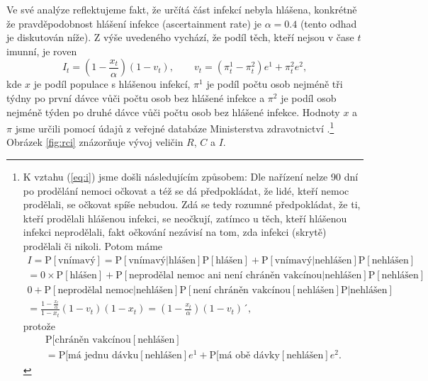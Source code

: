 Ve své analýze reflektujeme fakt, že určítá část infekcí nebyla
hlášena, konkrétně že pravděpodobnost hlášení infekce (ascertainment
rate) je $\alpha=0.4$ (tento odhad je diskutován níže). Z výše uvedeného vychází,
že podíl těch, kteří nejsou v čase $t$ imunní, je roven
\begin{equation}
I_{t}=\left(1-\frac{x_{t}}{\alpha}\right)\left(1-v_{t}\right),\qquad v_{t}=(\pi_{t}^{1}-\pi_{t}^{2})e^{1}+\pi_{t}^{2}e^{2},\label{eq:i}
\end{equation}
kde $x$ je podíl populace s hlášenou infekcí, $\pi^{1}$ je podíl počtu osob nejméně tři týdny po první dávce vůči počtu osob bez hlášené infekce a $\pi^{2}$ je podíl osob
nejméně týden po druhé dávce vůči počtu osob bez hlášené infekce. Hodnoty $x$ a $\pi$ jsme určili pomocí údajů z veřejné databáze Ministerstva
zdravotnictví \cite{mzcrdata}.\footnote{K vztahu (\ref{eq:i}) jsme došli následujícím způsobem: Dle nařízení \cite{covidportalspec} nelze 90 dní po prodělání nemoci očkovat a též se dá předpokládat, že lidé, kteří nemoc prodělali, se očkovat spíše nebudou. Zdá se tedy rozumné předpokládat, že ti, kteří prodělali hlášenou infekci, se neočkují, zatímco u těch, kteří hlášenou infekci neprodělali, fakt očkování nezávisí na tom, zda infekci (skrytě) prodělali či nikoli. Potom máme 
\begin{multline*}
I = \mathrm{P}[\text{vnímavý}]= \mathrm{P}[\text{vnímavý}|\text{hlášen}]\mathrm{P}[\text{hlášen}]
+\mathrm{P}[\text{vnímavý}|\text{nehlášen}]\mathrm{P}[\text{nehlášen}]
\\
= 0 \times \mathrm{P}[\text{hlášen}] 
+ \mathrm{P}[\text{neprodělal nemoc ani není chráněn vakcínou}|\text{nehlášen}]\mathrm{P}[\text{nehlášen}]
\\
0+\mathrm{P}[\text{neprodělal nemoc}|\text{nehlášen}]\mathrm{P}[\text{není chráněn vakcínou}[\text{nehlášen}]\mathrm{P}|\text{nehlášen}]
\\
= \frac{1-\frac{x_{t}}{\alpha}}{1-x_t}\left(1-v_{t}\right)(1-x_t)=\left(1-\frac{x_{t}}{\alpha}\right)\left(1-v_{t}\right)´,
\end{multline*}
protože
\begin{multline*}
\mathrm{P}[\text{chráněn vakcínou}[\text{nehlášen}]\\=\mathrm{P}[\text{má jednu dávku}[\text{nehlášen}]e^1+\mathrm{P}[\text{má obě dávky}[\text{nehlášen}] e^2.
\end{multline*}
}
Obrázek \ref{fig:rci} znázorňuje vývoj veličin $R$, $C$ a $I$.
